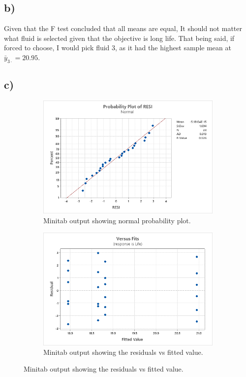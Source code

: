\documentclass{article}
\begin{document}
\subsection*{b)}
Given that the F test concluded that all means are equal, It should not matter what fluid is selected given that the objective is long life.
That being said, if forced to choose, I would pick fluid 3, as it had the highest sample mean at $\bar{y}_{3 \cdot} = 20.95$.
\subsection*{c)}
\begin{figure}[h]
    \centering
    \begin{subfigure}[b]{0.4\textwidth}
        \includegraphics[width=1.25\textwidth]{./images/4_c_1.png}
        \caption{Minitab output showing normal probability plot.}
      \label{fig:img1}
    \end{subfigure}
    \hfill
    \begin{subfigure}[b]{0.4\textwidth}
        \includegraphics[width=1.25\textwidth]{./images/4_c_2.png}
        \caption{Minitab output showing the residuals vs fitted value.}
      \label{fig:img2}
    \end{subfigure}
    \label{fig:both}
\end{figure}
\end{document}

